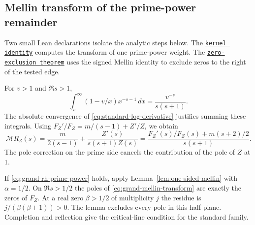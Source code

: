 \documentclass[11pt]{amsart}
\theoremstyle{definition}
\theoremstyle{remark}
\numberwithin{equation}{section}
\newcommand{\repositoryurl}{https://github.com/kimihiro64/Robin1984}
\newcommand{\proofrevision}{b359826e62c50b6cef55db4b2fcab793232498cc}
\newcommand{\codelink}[2]{%
  \href{\repositoryurl/blob/\proofrevision/#1}{\texttt{#2}}}
\begin{document}
\subsection{Mellin transform of the prime-power remainder}

Two small Lean declarations isolate the analytic steps below.
The \codelink{Robin1984/GRH/TriangularMellin.lean\#L27}
{kernel identity} computes the transform of one prime-power
weight. The \codelink{Robin1984/GRH/TriangularConverse.lean\#L43}
{zero-exclusion theorem} uses the signed Mellin identity to
exclude zeros to the right of the tested edge.

For \(v>1\) and \(\Re s>1\),
\[
 \int_v^\infty (1-v/x)x^{-s-1}\,dx=\frac{v^{-s}}{s(s+1)}.
\]
The absolute convergence of \eqref{eq:standard-log-derivative}
justifies summing these integrals. Using
\(F_Z'/F_Z=m/(s-1)+Z'/Z\), we obtain
\begin{equation}\label{eq:grand-mellin-transform}
 \mathcal{M}R_Z(s)
 =\frac{m}{2(s-1)}+\frac{Z'(s)}{s(s+1)Z(s)}
 =\frac{F_Z'(s)/F_Z(s)+m(s+2)/2}{s(s+1)}.
\end{equation}
The pole correction on the prime side cancels the contribution
of the pole of \(Z\) at \(1\).

If \eqref{eq:grand-rh-prime-power} holds, apply
Lemma~\ref{lem:one-sided-mellin} with \(\alpha=1/2\).
On \(\Re s>1/2\) the poles of \eqref{eq:grand-mellin-transform}
are exactly the zeros of \(F_Z\). At a real zero \(\beta>1/2\)
of multiplicity \(j\) the residue is \(j/(\beta(\beta+1))>0\).
The lemma excludes every pole in this half-plane. Completion
and reflection give the critical-line condition for the standard family.
\end{document}
